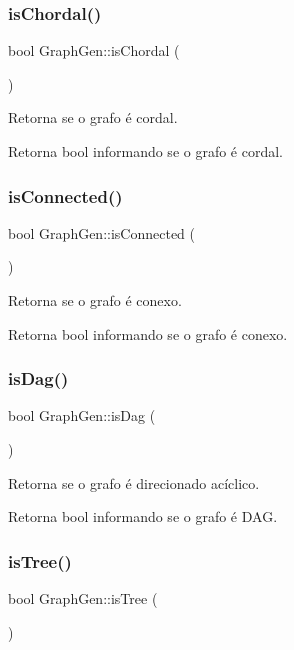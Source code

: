 \subsubsection{\texorpdfstring{isChordal()}{isChordal()}}
{\footnotesize\ttfamily bool Graph\+Gen\+::is\+Chordal (\begin{DoxyParamCaption}{ }\end{DoxyParamCaption})}

Retorna se o grafo é cordal. \begin{DoxyReturn}{Retorna}
bool informando se o grafo é cordal. 
\end{DoxyReturn}
\mbox{\label{classGraphGen_addc27f1b1daa452bb0943c867b550906}} 
\subsubsection{\texorpdfstring{isConnected()}{isConnected()}}
{\footnotesize\ttfamily bool Graph\+Gen\+::is\+Connected (\begin{DoxyParamCaption}{ }\end{DoxyParamCaption})}

Retorna se o grafo é conexo. \begin{DoxyReturn}{Retorna}
bool informando se o grafo é conexo. 
\end{DoxyReturn}
\mbox{\label{classGraphGen_ab4923b690b5fe013f35377b849bb6609}} 
\subsubsection{\texorpdfstring{isDag()}{isDag()}}
{\footnotesize\ttfamily bool Graph\+Gen\+::is\+Dag (\begin{DoxyParamCaption}{ }\end{DoxyParamCaption})}

Retorna se o grafo é direcionado acíclico. \begin{DoxyReturn}{Retorna}
bool informando se o grafo é D\+AG. 
\end{DoxyReturn}
\mbox{\label{classGraphGen_adffd99540a68b2c158cc1b089ccfd550}} 
\subsubsection{\texorpdfstring{isTree()}{isTree()}}
{\footnotesize\ttfamily bool Graph\+Gen\+::is\+Tree (\begin{DoxyParamCaption}{ }\end{DoxyParamCaption})}

